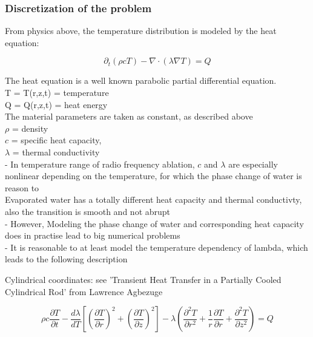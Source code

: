 \documentclass[parskip=half, titlepage=yes, 12pt, BCOR=12mm, DIV=calc]{scrartcl}
\begin{document}
\subsubsection{Discretization of the problem}

From physics above, the temperature distribution is modeled by the heat equation: 

\begin{equation}
    \partial_t (\rho c T) - \nabla \cdot (\lambda \nabla T) = Q
\end{equation}

The heat equation is a well known parabolic partial differential equation. \\

T = T(r,z,t) = temperature \\
Q = Q(r,z,t) = heat energy \\

The material parameters are taken as constant, as described above \\
$\rho$ = density \\
$c$ = specific heat capacity, \\
$\lambda$ = thermal conductivity \\
- In temperature range of radio frequency ablation, $c$ and $\lambda$ are especially nonlinear depending on the temperature, for which the phase change of water is reason to \\ Evaporated water has a totally different heat capacity and thermal conductivty, also the transition is smooth and not abrupt \\


- However, Modeling the phase change of water and corresponding heat capacity does in practise lead to big numerical problems \\

- It is reasonable to at least model the temperature dependency of lambda, which leads to the following description

Cylindrical coordinates: see 'Transient Heat Transfer in a Partially Cooled Cylindrical Rod' from Lawrence Agbezuge

\begin{equation}
    \rho c \frac{\partial T}{\partial t} -  \frac{d\lambda}{dT} \left[ \left( \frac{\partial T}{\partial r} \right)^2 + \left( \frac{\partial T}{\partial z} \right)^2 \right] - \lambda \left( \frac{\partial^2 T}{\partial r^2} + \frac{1}{r} \frac{\partial T}{\partial r} + \frac{\partial^2 T}{\partial z^2} \right) = Q
\end{equation}
\end{document}
